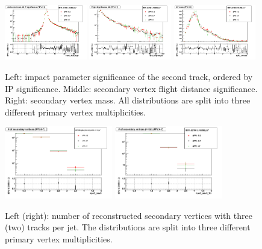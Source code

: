 \begin{figure}[h!]
\centering
\includegraphics[width=0.32\textwidth]{figures/npv_IP3d2sig0_Log.png}
\includegraphics[width=0.32\textwidth]{figures/npv_flightsig3d_Log.png}
\includegraphics[width=0.32\textwidth]{figures/npv_svmass_Linear.png}
\caption{Left: impact parameter significance of the second track, ordered by IP significance. Middle: secondary vertex flight distance significance. Right: secondary vertex mass. All distributions are split into three different primary vertex multiplicities.}
\label{fig:pvSVobservables}
\end{figure}

\begin{figure}[h!]
\centering
\includegraphics[width=0.42\textwidth]{figures/npv_nsv0_Log.png}
\includegraphics[width=0.42\textwidth]{figures/npv_nsv0_3tr_Log.png}
\caption{Left (right): number of reconstructed secondary vertices with three (two) tracks per jet. The distributions are split into three different primary vertex multiplicities.}
\label{fig:pvSVmult}
\end{figure}


